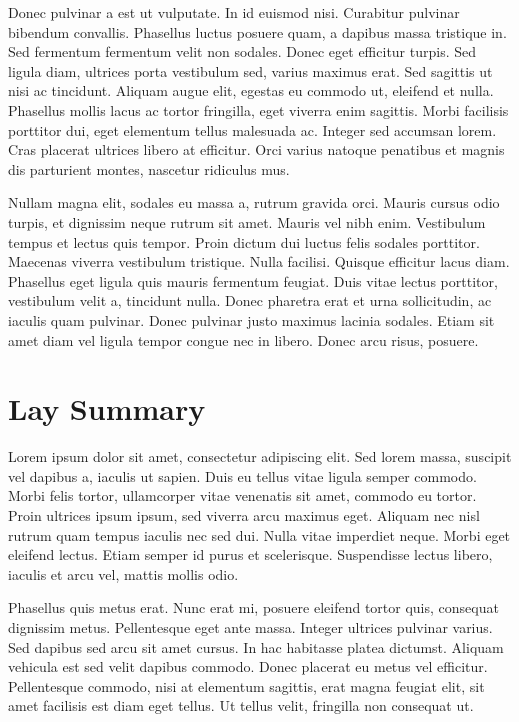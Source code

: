\documentclass[]{article}
\numberwithin{equation}{section}
\begin{document}
Donec pulvinar a est ut vulputate. In id euismod nisi. Curabitur pulvinar bibendum convallis. Phasellus luctus posuere quam, a dapibus massa tristique in. Sed fermentum fermentum velit non sodales. Donec eget efficitur turpis. Sed ligula diam, ultrices porta vestibulum sed, varius maximus erat. Sed sagittis ut nisi ac tincidunt. Aliquam augue elit, egestas eu commodo ut, eleifend et nulla. Phasellus mollis lacus ac tortor fringilla, eget viverra enim sagittis. Morbi facilisis porttitor dui, eget elementum tellus malesuada ac. Integer sed accumsan lorem. Cras placerat ultrices libero at efficitur. Orci varius natoque penatibus et magnis dis parturient montes, nascetur ridiculus mus.

Nullam magna elit, sodales eu massa a, rutrum gravida orci. Mauris cursus odio turpis, et dignissim neque rutrum sit amet. Mauris vel nibh enim. Vestibulum tempus et lectus quis tempor. Proin dictum dui luctus felis sodales porttitor. Maecenas viverra vestibulum tristique. Nulla facilisi. Quisque efficitur lacus diam. Phasellus eget ligula quis mauris fermentum feugiat. Duis vitae lectus porttitor, vestibulum velit a, tincidunt nulla. Donec pharetra erat et urna sollicitudin, ac iaculis quam pulvinar. Donec pulvinar justo maximus lacinia sodales. Etiam sit amet diam vel ligula tempor congue nec in libero. Donec arcu risus, posuere.

\clearpage

\section*{Lay Summary}

Lorem ipsum dolor sit amet, consectetur adipiscing elit. Sed lorem massa, suscipit vel dapibus a, iaculis ut sapien. Duis eu tellus vitae ligula semper commodo. Morbi felis tortor, ullamcorper vitae venenatis sit amet, commodo eu tortor. Proin ultrices ipsum ipsum, sed viverra arcu maximus eget. Aliquam nec nisl rutrum quam tempus iaculis nec sed dui. Nulla vitae imperdiet neque. Morbi eget eleifend lectus. Etiam semper id purus et scelerisque. Suspendisse lectus libero, iaculis et arcu vel, mattis mollis odio.

Phasellus quis metus erat. Nunc erat mi, posuere eleifend tortor quis, consequat dignissim metus. Pellentesque eget ante massa. Integer ultrices pulvinar varius. Sed dapibus sed arcu sit amet cursus. In hac habitasse platea dictumst. Aliquam vehicula est sed velit dapibus commodo. Donec placerat eu metus vel efficitur. Pellentesque commodo, nisi at elementum sagittis, erat magna feugiat elit, sit amet facilisis est diam eget tellus. Ut tellus velit, fringilla non consequat ut.
\end{document}
